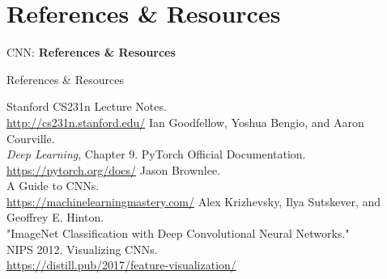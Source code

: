 \section{References \& Resources}
\begin{frame}{}
    \LARGE CNN: \textbf{References \& Resources}
\end{frame}

\begin{frame}[allowframebreaks]{References \& Resources}
    \begin{thebibliography}{99}
            Stanford CS231n Lecture Notes.\\
            \url{http://cs231n.stanford.edu/}
            Ian Goodfellow, Yoshua Bengio, and Aaron Courville.\\
            \textit{Deep Learning}, Chapter 9.
            PyTorch Official Documentation.\\
            \url{https://pytorch.org/docs/}
            Jason Brownlee.\\
            A Guide to CNNs.\\
            \url{https://machinelearningmastery.com/}
            Alex Krizhevsky, Ilya Sutskever, and Geoffrey E. Hinton.\\
            "ImageNet Classification with Deep Convolutional Neural Networks."\\
            NIPS 2012.
            Visualizing CNNs.\\
            \url{https://distill.pub/2017/feature-visualization/}
    \end{thebibliography}
\end{frame}